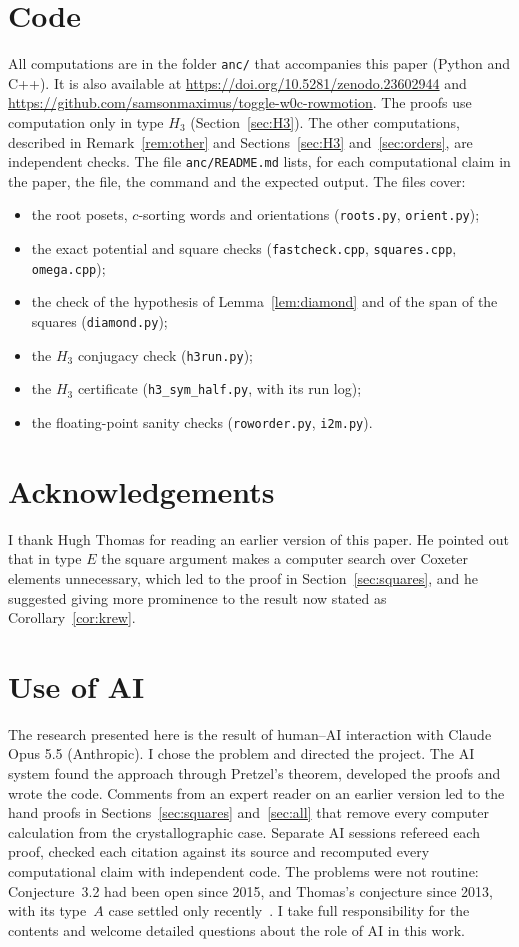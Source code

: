 \documentclass[11pt]{amsart}
\theoremstyle{definition}
\begin{document}
\section*{Code}
All computations are in the folder \texttt{anc/} that accompanies this paper (Python and C++). It is also available at \url{https://doi.org/10.5281/zenodo.23602944} and \url{https://github.com/samsonmaximus/toggle-w0c-rowmotion}. The proofs use computation only in type $H_3$ (Section~\ref{sec:H3}). The other computations, described in Remark~\ref{rem:other} and Sections~\ref{sec:H3} and~\ref{sec:orders}, are independent checks. The file \texttt{anc/README.md} lists, for each computational claim in the paper, the file, the command and the expected output. The files cover:
\begin{itemize}
\item the root posets, $c$-sorting words and orientations (\texttt{roots.py}, \texttt{orient.py});
\item the exact potential and square checks (\texttt{fastcheck.cpp}, \texttt{squares.cpp}, \texttt{omega.cpp});
\item the check of the hypothesis of Lemma~\ref{lem:diamond} and of the span of the squares (\texttt{diamond.py});
\item the $H_3$ conjugacy check (\texttt{h3run.py});
\item the $H_3$ certificate (\texttt{h3\_sym\_half.py}, with its run log);
\item the floating-point sanity checks (\texttt{roworder.py}, \texttt{i2m.py}).
\end{itemize}

\section*{Acknowledgements}
I thank Hugh Thomas for reading an earlier version of this paper. He pointed out that in type $E$ the square argument makes a computer search over Coxeter elements unnecessary, which led to the proof in Section~\ref{sec:squares}, and he suggested giving more prominence to the result now stated as Corollary~\ref{cor:krew}.

\section*{Use of AI}
The research presented here is the result of human--AI interaction with Claude Opus 5.5 (Anthropic). I chose the problem and directed the project. The AI system found the approach through Pretzel's theorem, developed the proofs and wrote the code. Comments from an expert reader on an earlier version led to the hand proofs in Sections~\ref{sec:squares} and~\ref{sec:all} that remove every computer calculation from the crystallographic case. Separate AI sessions refereed each proof, checked each citation against its source and recomputed every computational claim with independent code. The problems were not routine: Conjecture~3.2 had been open since 2015, and Thomas's conjecture since 2013, with its type~$A$ case settled only recently~\cite{DFISTW}. I take full responsibility for the contents and welcome detailed questions about the role of AI in this work.
\end{document}

